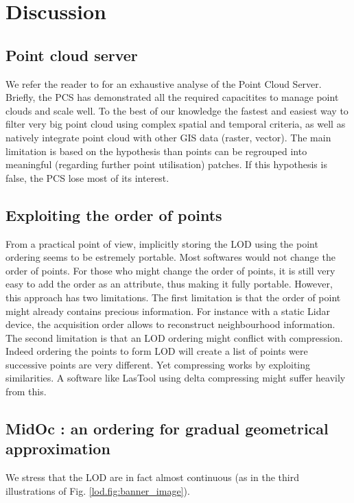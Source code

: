 

 \section{ Discussion }
	 \label{lod.sec:discussion} 
	 
	 \subsection{Point cloud server}
	\label{lod.par:pointcloudserver-limitation}
	We refer the reader to \cite{Cura2015} for an exhaustive analyse of the Point Cloud Server.
	Briefly, the PCS has demonstrated all the required capacitites to manage point clouds and scale well.
	To the best of our knowledge the fastest and easiest way to filter very big point cloud using complex spatial and temporal criteria, as well as natively integrate point cloud with other GIS data (raster, vector).
	The main limitation is based on the hypothesis than points can be regrouped into meaningful (regarding further point utilisation) patches. If this hypothesis is false, the PCS lose most of its interest.
	 
		 
	\subsection{Exploiting the order of points}
	From a practical point of view, implicitly storing the LOD using the point ordering
	seems to be estremely portable. Most softwares would not change the order of points.
	For those who might change the order of points, 
	it is still very easy to add the order as an attribute, thus making it fully portable.
	However, this approach has two limitations.
	The first limitation is that the order of point might already contains precious information. 
	For instance with a static Lidar device,
	the acquisition order allows to reconstruct neighbourhood information.
	The second limitation is that an LOD ordering might conflict with compression.
	Indeed ordering the points to form LOD will create a list of points were successive points are very different. Yet compressing works by exploiting similarities.
	A software like LasTool using delta compressing might suffer heavily from this. 
			 
	 \subsection{MidOc : an ordering for gradual geometrical approximation}
	 	We stress that the LOD are in fact almost continuous (as in the third illustrations of Fig.  \ref{lod.fig:banner_image}). 
		 	
